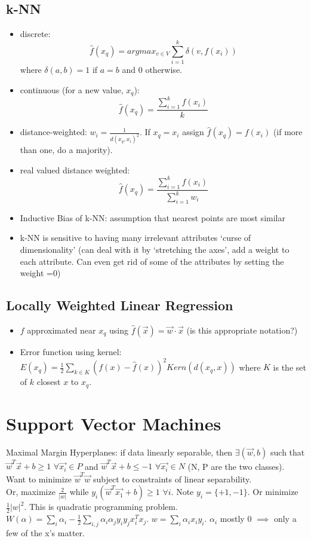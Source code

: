 \documentclass[titlepage,11pt]{article}
\begin{document}
\subsection{k-NN}
\begin{itemize}
\item discrete: $$\hat{f} (x_q) =argmax_{v \in V} \sum_{i=1}^k{\delta(v, f(x_i))}$$ where $\delta(a,b) =1$ if $a=b$ and $0$ otherwise.
\item continuous (for a new value, $x_q$): $$\hat{f} (x_q) = \frac{\sum_{i=1}^{k}{f(x_i)}}{k}$$
\item distance-weighted: $w_i = \frac{1}{d(x_q, x_i)^2}$. If $x_q = x_i$ assign $\hat{f} (x_q) = f(x_i)$ (if more than one, do a majority).
\item real valued distance weighted: $$\hat{f} (x_q) = \frac{\sum_{i=1}^{k}{f(x_i)}}{\sum_{i=1}^{k}{w_i}}$$
\item  Inductive Bias of k-NN: assumption that nearest points are most similar
\item k-NN is sensitive to having many irrelevant attributes `curse of dimensionality' (can deal with it by `stretching the axes', add a weight to each attribute. Can even get rid of some of the attributes by setting the weight =0)
\end{itemize}

\subsection{Locally Weighted Linear Regression}
\begin{itemize}
\item $f$ approximated near $x_q$ using $\hat{f}(\vec{x}) = \vec{w} \cdot \vec{x}$ (is this appropriate notation?)
\item Error function using kernel: $E(x_q) = \frac12 \sum_{k\in K}{(f(x) - \hat{f}(x))^2 Kern(d(x_q, x))}$ where $K$ is the set of $k$ closest $x$ to $x_q$.
\end{itemize}

\section{Support Vector Machines}
Maximal Margin Hyperplanes: if data linearly separable, then $\exists (\vec{w}, b)$ such that $\vec{w}^T\vec{x} + b \geq 1$ $\forall \vec{x_i} \in P$ and $\vec{w}^T\vec{x} + b \leq -1$ $\forall \vec{x_i} \in N$ (N, P are the two classes). Want to minimize $\vec{w}^T\vec{w}$ subject to constraints of linear separability.\\ Or, maximize $\frac2{|w|}$ while $y_i(\vec{w}^T\vec{x_1}+b) \geq 1$ $\forall i$. Note $y_i =\{+1, -1\}$. Or minimize $\frac12 |w|^2$. This is quadratic programming problem.\\
$W(\alpha) = \sum_{i} \alpha_i - \frac12 \sum_{i,j} \alpha_i \alpha_j y_i y_j x_i^T x_j$. $w = \sum_i \alpha_i x_i y_i$. $\alpha_i$ mostly 0 $\implies$ only a few of the x's matter.
\end{document}
